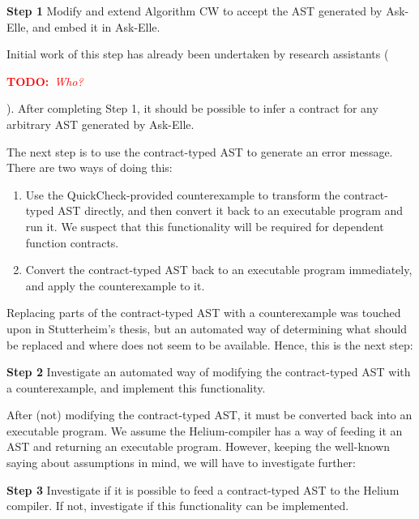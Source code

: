 \documentclass[10pt]{report}
\newcommand{\annotate}[3]{
	\begin{scriptsize}
	\textcolor{#1}{\textbf{#2}~\textit{#3}}
	\end{scriptsize}\newline}
\newcommand{\todo}[1]{\annotate{red} {TODO:} {#1}}
\begin{document}
\begin{description}
	\item{\textbf{Step 1}} Modify and extend Algorithm CW to accept the AST generated by Ask-Elle, and embed it in Ask-Elle.
\end{description}

Initial work of this step has already been undertaken by research assistants (\todo{Who?}).
After completing Step 1, it should be possible to infer a contract for any arbitrary AST generated by Ask-Elle.

The next step is to use the contract-typed AST to generate an error message.
There are two ways of doing this:

\begin{enumerate}
	\item Use the QuickCheck-provided counterexample to transform the contract-typed AST directly, and then convert it back to an executable program and run it. We suspect that this functionality will be required for dependent function contracts.
	\item Convert the contract-typed AST back to an executable program immediately, and apply the counterexample to it.
\end{enumerate}

Replacing parts of the contract-typed AST with a counterexample was touched upon in Stutterheim's thesis, but an automated way of determining what should be replaced and where does not seem to be available.
Hence, this  is the next step:
\begin{description}
	\item{\textbf{Step 2}} Investigate an automated way of modifying the contract-typed AST with a counterexample, and implement this functionality.
\end{description}

After (not) modifying the contract-typed AST, it must be converted back into an executable program.
We assume the Helium-compiler has a way of feeding it an AST and returning an executable program.
However, keeping the well-known saying about assumptions in mind, we will have to investigate further:

\begin{description}
	\item{\textbf{Step 3}} Investigate if it is possible to feed a contract-typed AST to the Helium compiler. If not, investigate if this functionality can be implemented.
\end{description}
\end{document}
